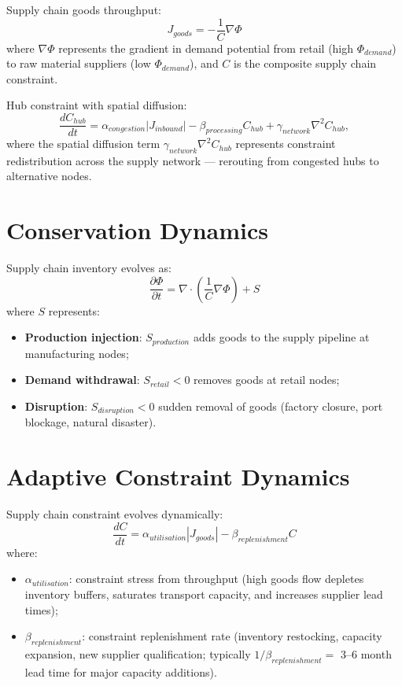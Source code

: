 \documentclass[11pt]{article}
\begin{document}
Supply chain goods throughput:
\begin{equation}
J_{goods} = -\frac{1}{C}\nabla \Phi
\end{equation}
where $\nabla\Phi$ represents the gradient in demand potential from retail (high $\Phi_{demand}$)
to raw material suppliers (low $\Phi_{demand}$), and $C$ is the composite supply chain constraint.

Hub constraint with spatial diffusion:
\begin{equation}
\frac{dC_{hub}}{dt} = \alpha_{congestion}|J_{inbound}| - \beta_{processing} C_{hub} + \gamma_{network}\nabla^2 C_{hub},
\end{equation}
where the spatial diffusion term $\gamma_{network}\nabla^2 C_{hub}$ represents constraint
redistribution across the supply network --- rerouting from congested hubs to alternative nodes.

\section{Conservation Dynamics}

Supply chain inventory evolves as:
\begin{equation}
\frac{\partial \Phi}{\partial t} = \nabla \cdot \left(\frac{1}{C}\nabla \Phi\right) + S
\end{equation}
where $S$ represents:
\begin{itemize}
    \item \textbf{Production injection}: $S_{production}$ adds goods to the supply pipeline at
          manufacturing nodes;
    \item \textbf{Demand withdrawal}: $S_{retail} < 0$ removes goods at retail nodes;
    \item \textbf{Disruption}: $S_{disruption} < 0$ sudden removal of goods (factory closure,
          port blockage, natural disaster).
\end{itemize}

\section{Adaptive Constraint Dynamics}

Supply chain constraint evolves dynamically:
\begin{equation}
\frac{dC}{dt} = \alpha_{utilisation}|J_{goods}| - \beta_{replenishment} C
\end{equation}
where:
\begin{itemize}
    \item $\alpha_{utilisation}$: constraint stress from throughput (high goods flow depletes
          inventory buffers, saturates transport capacity, and increases supplier lead times);
    \item $\beta_{replenishment}$: constraint replenishment rate (inventory restocking, capacity
          expansion, new supplier qualification; typically $1/\beta_{replenishment} = $ 3--6 month
          lead time for major capacity additions).
\end{itemize}
\end{document}
